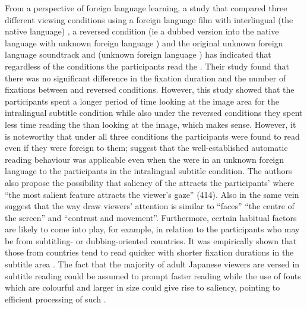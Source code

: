 \documentclass[output=paper]{langsci/langscibook}
\begin{document}
From a perspective of foreign language learning, a study \citep{bisson2014} that compared three different viewing conditions using a foreign language film with interlingual (the native language) , a reversed condition (ie a dubbed version into the native language with unknown foreign language ) and the original unknown foreign language soundtrack and  (unknown foreign language ) has indicated that regardless of the conditions the participants read the . Their study found that there was no significant difference in the fixation duration and the number of fixations between  and reversed conditions. However, this study showed that the participants spent a longer period of time looking at the image area for the intralingual subtitle condition while also under the reversed conditions they spent less time reading the  than looking at the image, which makes sense. However, it is noteworthy that under all three conditions the participants were found to read  even if they were foreign to them; \citet[414]{bisson2014} suggest that the well-established automatic reading behaviour was applicable even when the  were in an unknown foreign language to the participants in the intralingual subtitle condition. The authors also propose the possibility that saliency of the  attracts the participants'  where ``the most salient feature attracts the viewer's gaze'' (414).  Also in the same vein \citet[n.p.]{Kruger2015} suggest that the way  draw viewers' attention is similar to ``faces'' ``the centre of the screen'' and ``contrast and movement''. Furthermore, certain habitual factors are likely to come into play, for example, in relation to the participants who may be from subtitling- or dubbing-oriented countries. It was empirically shown that those from  countries tend to read  quicker with shorter fixation durations in the subtitle area \citep{Bruycker2007}.  The fact that the majority of adult Japanese viewers are versed in subtitle reading could be assumed to prompt faster reading while the use of fonts which are colourful and larger in size could give rise to saliency, pointing to efficient processing of such .   
\end{document}
